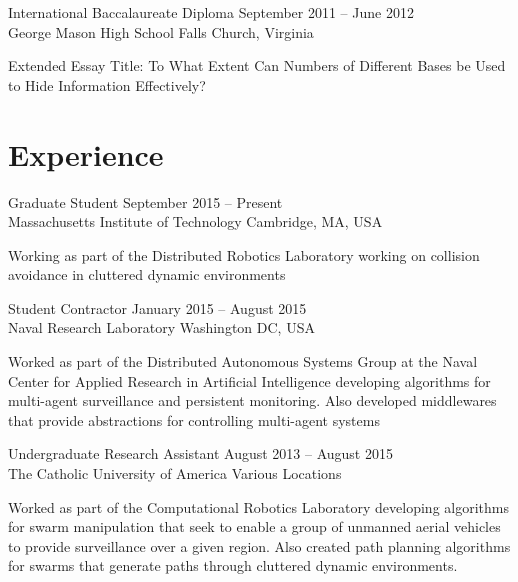 \documentclass[line,margin]{cv}
\begin{document}
\begin{resume}
\begin{adjustwidth}{2.5em}{2.5em}
\end{adjustwidth}

International Baccalaureate Diploma
\hfill September 2011 -- June 2012 \\
George Mason High School \hfill Falls Church, Virginia
\begin{adjustwidth}{2.5em}{2.5em}

    Extended Essay Title: To What Extent Can Numbers of Different Bases be Used
    to Hide Information Effectively?

\end{adjustwidth}

\section{Experience}

Graduate Student
\hfill September 2015 -- Present \\
Massachusetts Institute of Technology \hfill Cambridge, MA, USA

\begin{adjustwidth}{2.5em}{2.5em}

    Working as part of the Distributed Robotics Laboratory working on collision
    avoidance in cluttered dynamic environments

\end{adjustwidth}


Student Contractor
\hfill January 2015 -- August 2015 \\
Naval Research Laboratory \hfill Washington DC, USA

\begin{adjustwidth}{2.5em}{2.5em}

    Worked as part of the Distributed Autonomous Systems Group at the Naval
    Center for Applied Research in Artificial Intelligence developing
    algorithms for multi-agent surveillance and persistent monitoring. Also
    developed middlewares that provide abstractions for controlling multi-agent
    systems

\end{adjustwidth}

Undergraduate Research Assistant
\hfill August 2013 -- August 2015 \\
The Catholic University of America \hfill Various Locations

\begin{adjustwidth}{2.5em}{2.5em}

    Worked as part of the Computational Robotics Laboratory developing
    algorithms for swarm manipulation that seek to enable a group of unmanned
    aerial vehicles to provide surveillance over a given region. Also created
    path planning algorithms for swarms that generate paths through cluttered
    dynamic environments.


\end{adjustwidth}
\end{resume}
\end{document}

